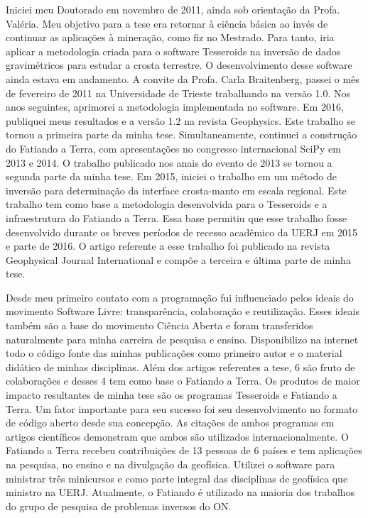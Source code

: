 Iniciei meu Doutorado em novembro de 2011, ainda sob orientação da Profa.
Valéria. Meu objetivo para a tese era retornar à ciência básica ao invés de
continuar as aplicações à mineração, como fiz no Mestrado. Para tanto, iria
aplicar a metodologia criada para o software Tesseroids na inversão de dados
gravimétricos para estudar a crosta terrestre. O desenvolvimento desse software
ainda estava em andamento. A convite da Profa. Carla Braitenberg, passei o mês
de fevereiro de 2011 na Universidade de Trieste trabalhando na versão 1.0. Nos
anos seguintes, aprimorei a metodologia implementada no software. Em 2016,
publiquei meus resultados e a versão 1.2 na revista Geophysics. Este trabalho
se tornou a primeira parte da minha tese. Simultaneamente, continuei a
construção do Fatiando a Terra, com apresentações no congresso internacional
SciPy em 2013 e 2014. O trabalho publicado nos anais do evento de 2013 se
tornou a segunda parte da minha tese. Em 2015, iniciei o trabalho em um método
de inversão para determinação da interface crosta-manto em escala regional.
Este trabalho tem como base a metodologia desenvolvida para o Tesseroids e a
infraestrutura do Fatiando a Terra. Essa base permitiu que esse trabalho fosse
desenvolvido durante os breves períodos de recesso acadêmico da UERJ em 2015 e
parte de 2016. O artigo referente a esse trabalho foi publicado na revista
Geophysical Journal International e compõe a terceira e última parte de minha
tese.

Desde meu primeiro contato com a programação fui influenciado pelos ideais do
movimento Software Livre: transparência, colaboração e reutilização. Esses
ideais também são a base do movimento Ciência Aberta e foram transferidos
naturalmente para minha carreira de pesquisa e ensino. Disponibilizo na
internet todo o código fonte das minhas publicações como primeiro autor e o
material didático de minhas disciplinas. Além dos artigos referentes a tese, 6
são fruto de colaborações e desses 4 tem como base o Fatiando a Terra.
Os produtos de maior impacto resultantes de minha tese são os programas
Tesseroids e Fatiando a Terra. Um fator importante para seu sucesso foi seu
desenvolvimento no formato de código aberto desde sua concepção. As citações de
ambos programas em artigos científicos demonstram que ambos são utilizados
internacionalmente. O Fatiando a Terra recebeu contribuições de 13 pessoas de 6
países e tem aplicações na pesquisa, no ensino e na divulgação da geofísica.
Utilizei o software para ministrar três minicursos e como parte integral das
disciplinas de geofísica que ministro na UERJ. Atualmente, o Fatiando é
utilizado na maioria dos trabalhos do grupo de pesquisa de problemas inversos
do ON.







